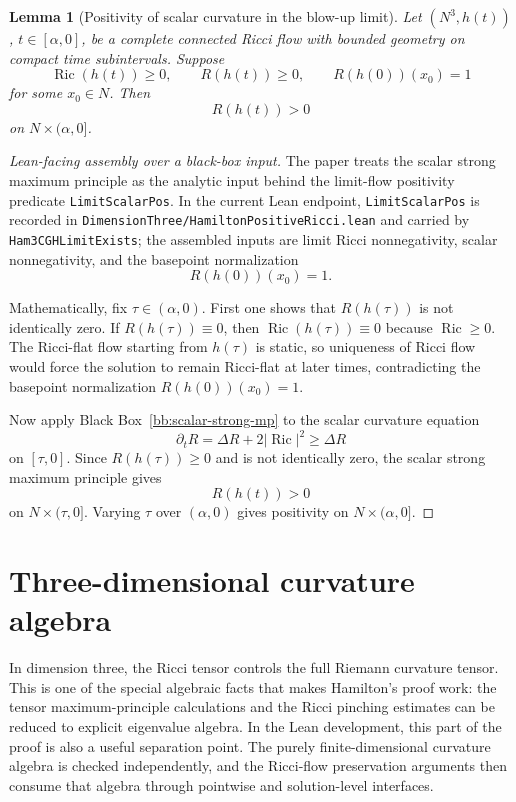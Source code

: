 \documentclass[11pt]{article}
\theoremstyle{plain}
\newtheorem{lemma}[theorem]{Lemma}
\theoremstyle{definition}
\theoremstyle{remark}
\newcommand{\Ric}{\operatorname{Ric}}
\newcommand{\norm}[1]{\left|#1\right|}
\newcommand{\leanref}[1]{\nolinkurl{#1}}
\newcommand{\leanfile}[1]{\nolinkurl{#1}}
\newcommand{\rffile}[1]{\leanfile{#1}}
\begin{document}
\begin{lemma}[Positivity of scalar curvature in the blow-up limit]
\label{lem:limit-scalar-positive}
Let $(N^3,h(t))$, $t\in[\alpha,0]$, be a complete connected Ricci flow with
bounded geometry on compact time subintervals. Suppose
\[
\Ric(h(t))\ge0,
\qquad
R(h(t))\ge0,
\qquad
R(h(0))(x_0)=1
\]
for some $x_0\in N$. Then
\[
R(h(t))>0
\]
on $N\times(\alpha,0]$.
\end{lemma}

\begin{proof}[Lean-facing assembly over a black-box input]
The paper treats the scalar strong maximum principle as the analytic input
behind the limit-flow positivity predicate \leanref{LimitScalarPos}.  In the
current Lean endpoint, \leanref{LimitScalarPos} is recorded in
\rffile{DimensionThree/HamiltonPositiveRicci.lean} and carried by
\leanref{Ham3CGHLimitExists}; the assembled inputs are limit Ricci
nonnegativity, scalar nonnegativity, and the basepoint normalization
\[
  R(h(0))(x_0)=1.
\]

Mathematically, fix $\tau\in(\alpha,0)$.  First one shows that
$R(h(\tau))$ is not identically zero.  If $R(h(\tau))\equiv0$, then
$\Ric(h(\tau))\equiv0$ because $\Ric\ge0$.  The Ricci-flat flow starting from
$h(\tau)$ is static, so uniqueness of Ricci flow would force the solution to
remain Ricci-flat at later times, contradicting the basepoint normalization
$R(h(0))(x_0)=1$.

Now apply Black Box~\ref{bb:scalar-strong-mp} to the scalar curvature equation
\[
  \partial_tR=\Delta R+2\norm{\Ric}^2\ge\Delta R
\]
on $[\tau,0]$.  Since $R(h(\tau))\ge0$ and is not identically zero, the scalar
strong maximum principle gives
\[
  R(h(t))>0
\]
on $N\times(\tau,0]$.  Varying $\tau$ over $(\alpha,0)$ gives positivity on
$N\times(\alpha,0]$.
\end{proof}


\section{Three-dimensional curvature algebra}

In dimension three, the Ricci tensor controls the full Riemann curvature tensor.
This is one of the special algebraic facts that makes Hamilton's proof work:
the tensor maximum-principle calculations and the Ricci pinching estimates can
be reduced to explicit eigenvalue algebra.  In the Lean development, this part
of the proof is also a useful separation point.  The purely finite-dimensional
curvature algebra is checked independently, and the Ricci-flow preservation
arguments then consume that algebra through pointwise and solution-level
interfaces.
\end{document}
